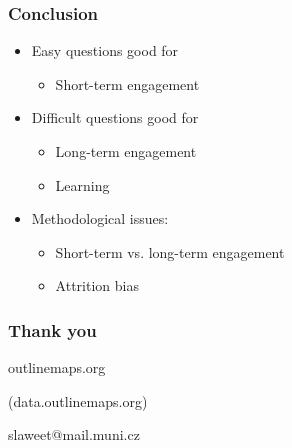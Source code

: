 \documentclass[bigger]{beamer}
\begin{document}
\begin{frame}
  \frametitle{Conclusion}
	\begin{itemize}
		\item Easy questions good for
    \begin{itemize}
      \item Short-term engagement
    \end{itemize}
		\item Difficult questions good for
    \begin{itemize}
      \item Long-term engagement
      \item Learning 
    \end{itemize}
		\item Methodological issues:
    \begin{itemize}
      \item Short-term vs. long-term engagement
      \item Attrition bias
    \end{itemize}
	\end{itemize}

\end{frame}




\begin{frame}
	\begin{center}
  \frametitle{Thank you}

		\bigskip

		{\Huge outlinemaps.org}

		\medskip
		(data.outlinemaps.org)

		\bigskip
		\bigskip
		slaweet@mail.muni.cz
	\end{center}
\end{frame}
\end{document}
